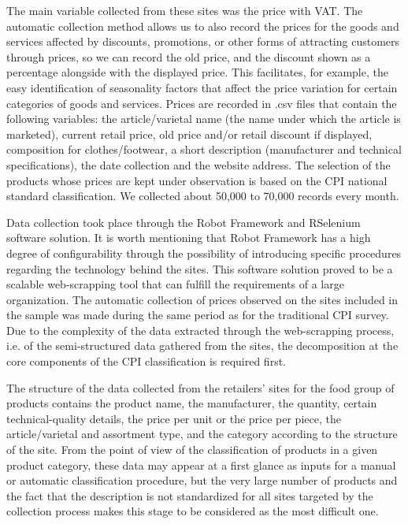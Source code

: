 \documentclass[]{article}
\begin{document}
The main variable collected from these sites was the price with VAT. The automatic collection method allows us to also 
record the prices for the goods and services affected by discounts, promotions, or other forms of attracting customers
through prices, so we can record the old price, and the discount shown as a percentage alongside with the displayed price. 
This facilitates, for example, the easy identification of seasonality factors that affect the price variation for
certain categories of goods and services. Prices are recorded in .csv files that contain the following variables: 
the article/varietal name (the name under which the article is marketed), current retail price, old price and/or 
retail discount if displayed, composition for clothes/footwear, a short description (manufacturer and technical 
specifications), the date collection and the website address. The selection of the products whose prices are kept
under observation is based on the CPI national standard classification. We collected about 50,000 to 70,000 records every month.


Data collection took place through the Robot Framework and RSelenium software solution. It is worth mentioning that Robot Framework
has a high degree of configurability through the possibility of introducing specific procedures regarding the technology
behind the sites. This software solution proved to be a scalable web-scrapping tool that can fulfill the requirements of a 
large organization. The automatic collection of prices observed on the sites included in the sample was made during
the same period as for the traditional CPI survey. Due to the complexity of the data extracted through the 
web-scrapping process, i.e. of the semi-structured data gathered from the sites, the decomposition at the 
core components of the CPI classification is required first.


The structure of the data collected from the retailers’ sites for the food group of products contains the product 
name, the manufacturer, the quantity, certain technical-quality details, the price per unit or the price per piece, 
the article/varietal and assortment type, and the category according to the structure of the site. From the point of view 
of the classification of products in a given product category, these data may appear at a first glance 
as inputs for a manual or automatic classification procedure, but the very large number of products and the fact 
that the description is not standardized for all sites targeted by the collection process makes this stage to be considered as the most difficult one.
\end{document}
